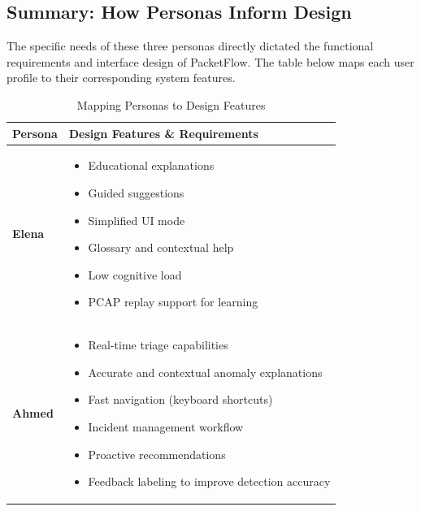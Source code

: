 \documentclass[
    11pt, 
    a4paper, 
    parskip=half, 
    headsepline,       %
    DIV=12             %
]{scrartcl}
\begin{document}
\subsection*{Summary: How Personas Inform Design}
The specific needs of these three personas directly dictated the functional requirements and interface design of PacketFlow. The table below maps each user profile to their corresponding system features.

\begin{table}[h]
    \centering
    \renewcommand{\arraystretch}{1.4}
    \caption{Mapping Personas to Design Features}
    \begin{tabularx}{\linewidth}{lX}
        \toprule
        \textbf{\color{pfBlue} Persona} & \textbf{\color{pfBlue} Design Features \& Requirements} \\
        \midrule
        
        \textbf{Elena} & 
        \vspace{-0.8em} %
        \begin{itemize}[leftmargin=1em, nosep]
            \item Educational explanations
            \item Guided suggestions
            \item Simplified UI mode
            \item Glossary and contextual help
            \item Low cognitive load
            \item PCAP replay support for learning
        \end{itemize} 
        \vspace{0.3em}
        \\
        
        \textbf{Ahmed} & 
        \vspace{-0.8em}
        \begin{itemize}[leftmargin=1em, nosep]
            \item Real-time triage capabilities
            \item Accurate and contextual anomaly explanations
            \item Fast navigation (keyboard shortcuts)
            \item Incident management workflow
            \item Proactive recommendations
            \item Feedback labeling to improve detection accuracy
        \end{itemize}
        \vspace{0.3em}
        \\
        

\end{tabularx}
\end{table}
\end{document}
